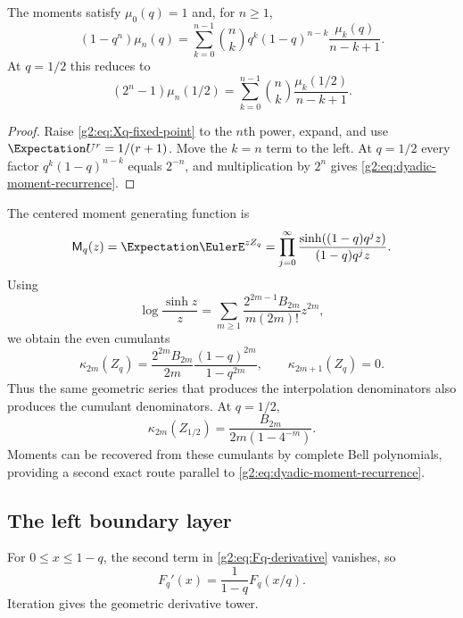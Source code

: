 \begin{theorem}
\label{g2:thm:moment-recurrence}
The moments satisfy $\mu_0(q)=1$ and, for $n\ge1$,
\begin{equation}
 (1-q^n)\mu_n(q)
 =\sum_{k=0}^{n-1}\binom nk
 q^k(1-q)^{n-k}\frac{\mu_k(q)}{n-k+1}.
 \label{g2:eq:general-moment-recurrence}
\end{equation}
At $q=1/2$ this reduces to
\begin{equation}
 (2^n-1)\mu_n(1/2)
 =\sum_{k=0}^{n-1}\binom nk\frac{\mu_k(1/2)}{n-k+1}.
 \label{g2:eq:dyadic-moment-recurrence}
\end{equation}
\end{theorem}

\begin{proof}
Raise \eqref{g2:eq:Xq-fixed-point} to the $n$th power, expand, and use
$\Expectation U^r=1/(r+1)$.  Move the $k=n$ term to the left.  At $q=1/2$ every factor
$q^k(1-q)^{n-k}$ equals $2^{-n}$, and multiplication by $2^n$ gives
\eqref{g2:eq:dyadic-moment-recurrence}.
\end{proof}

The centered moment generating function is
\begin{equation}
 \Mq(z)=\Expectation\EulerE^{zZ_q}
 =\prod_{j=0}^\infty
 \frac{\sinh((1-q)q^jz)}{(1-q)q^jz}.
 \label{g2:eq:uq-mgf}
\end{equation}
Using
\[
 \log\frac{\sinh z}{z}
 =\sum_{m\ge1}\frac{2^{2m-1}B_{2m}}{m(2m)!}z^{2m},
\]
we obtain the even cumulants
\begin{equation}
 \kappa_{2m}(Z_q)
 =\frac{2^{2m}B_{2m}}{2m}
   \frac{(1-q)^{2m}}{1-q^{2m}},
 \qquad
 \kappa_{2m+1}(Z_q)=0.
 \label{g2:eq:uq-cumulants}
\end{equation}
Thus the same geometric series that produces the interpolation denominators
also produces the cumulant denominators.  At $q=1/2$,
\begin{equation}
 \kappa_{2m}(Z_{1/2})
 =\frac{B_{2m}}{2m(1-4^{-m})}.
 \label{g2:eq:up-cumulants}
\end{equation}
Moments can be recovered from these cumulants by complete Bell polynomials,
providing a second exact route parallel to \eqref{g2:eq:dyadic-moment-recurrence}.

\subsection{The left boundary layer}

For $0\le x\le1-q$, the second term in \eqref{g2:eq:Fq-derivative} vanishes, so
\begin{equation}
 F_q'(x)=\frac1{1-q}F_q(x/q).
 \label{g2:eq:left-boundary-first}
\end{equation}
Iteration gives the geometric derivative tower.

